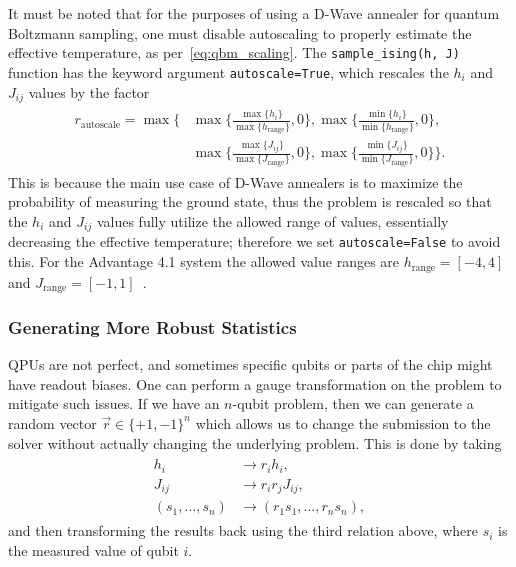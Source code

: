 It must be noted that for the purposes of using a D-Wave annealer for quantum Boltzmann sampling, one must disable autoscaling to properly estimate the effective temperature, as per~\cref{eq:qbm_scaling}.
The \texttt{sample\_ising(h, J)} function has the keyword argument \texttt{autoscale=True}, which rescales the \( h_i \) and \( J_{ij} \) values by the factor~\cite{dwave_solver_parameters}
\begin{align}
\begin{split}
    r_\text{autoscale}
        = \max\Bigg\{
            &\max\bigg\{\frac{\max\{h_i\}}{\max\{h_\text{range}\}},0\bigg\},
            \max\bigg\{\frac{\min\{h_i\}}{\min\{h_\text{range}\}},0\bigg\}, \\
            &\max\bigg\{\frac{\max\{J_{ij}\}}{\max\{J_\text{range}\}},0\bigg\},
            \max\bigg\{\frac{\min\{J_{ij}\}}{\min\{J_\text{range}\}},0\bigg\}
        \Bigg\}.
\end{split}
\end{align}
This is because the main use case of D-Wave annealers is to maximize the probability of measuring the ground state, thus the problem is rescaled so that the \( h_i \) and \( J_{ij} \) values fully utilize the allowed range of values, essentially decreasing the effective temperature; therefore we set \texttt{autoscale=False} to avoid this.
For the Advantage 4.1 system the allowed value ranges are \( h_\text{range} = [-4, 4] \) and \( J_\text{range} = [-1, 1] \)~\cite{dwave_solver_properties}.

\subsubsection{Generating More Robust Statistics}\label{sec:gauge}
QPUs are not perfect, and sometimes specific qubits or parts of the chip might have readout biases.
One can perform a gauge transformation on the problem to mitigate such issues.
If we have an \( n \)-qubit problem, then we can generate a random vector \( \vec{r} \in \{+1, -1\}^n \) which allows us to change the submission to the solver without actually changing the underlying problem.
This is done by taking
\begin{align}
\begin{split}
    h_i
        &\rightarrow r_i h_i, \\
    J_{ij}
        &\rightarrow r_i r_j J_{ij}, \\
    (s_1, \dots, s_n)
        &\rightarrow (r_1 s_1, \dots, r_n s_n),
\end{split}
\end{align}
and then transforming the results back using the third relation above, where \( s_i \) is the measured value of qubit \( i \).

